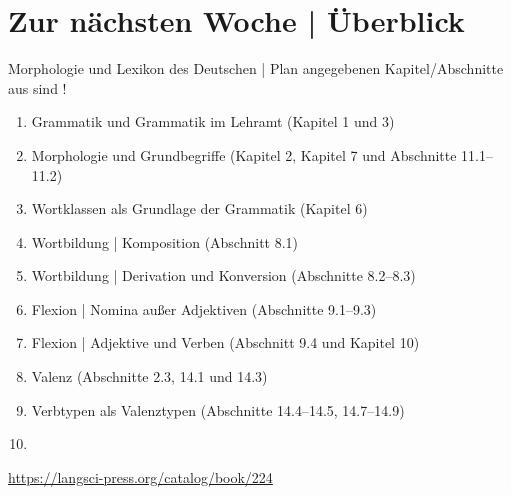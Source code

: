 \ifdefined\TITLE
  \section{Zur nächsten Woche | Überblick}

  \begin{frame}
    {Morphologie und Lexikon des Deutschen | Plan}
     angegebenen Kapitel\slash Abschnitte aus  sind !\\
    \Halbzeile
    \begin{enumerate}
      \item Grammatik und Grammatik im Lehramt (Kapitel 1 und 3)
      \item Morphologie und Grundbegriffe (Kapitel 2, Kapitel 7 und Abschnitte 11.1--11.2)
      \item Wortklassen als Grundlage der Grammatik (Kapitel 6)
      \item Wortbildung | Komposition (Abschnitt 8.1)
      \item Wortbildung | Derivation und Konversion (Abschnitte 8.2--8.3)
      \item Flexion | Nomina außer Adjektiven (Abschnitte 9.1--9.3)
      \item Flexion | Adjektive und Verben (Abschnitt 9.4 und Kapitel 10)
      \item Valenz (Abschnitte 2.3, 14.1 und 14.3)
      \item Verbtypen als Valenztypen (Abschnitte 14.4--14.5, 14.7--14.9) 
      \item {}
    \end{enumerate}
    \Halbzeile
    \centering 
    \url{https://langsci-press.org/catalog/book/224}
  \end{frame}
\fi
